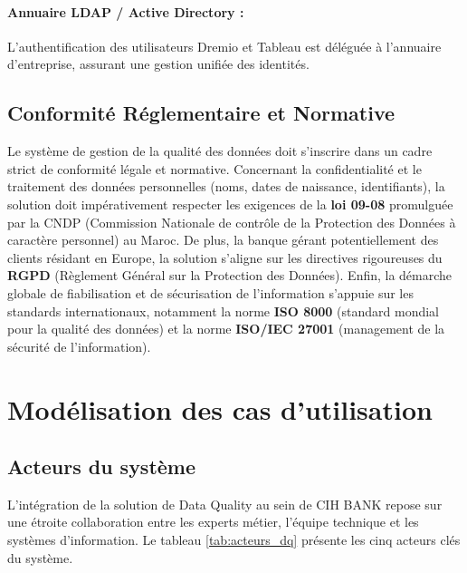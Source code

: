 \paragraph{Annuaire LDAP / Active Directory :} L'authentification des utilisateurs Dremio et Tableau est déléguée à l'annuaire d'entreprise, assurant une gestion unifiée des identités.

\subsection{Conformité Réglementaire et Normative}
Le système de gestion de la qualité des données doit s'inscrire dans un cadre strict de conformité légale et normative. Concernant la confidentialité et le traitement des données personnelles (noms, dates de naissance, identifiants), la solution doit impérativement respecter les exigences de la \textbf{loi 09-08} promulguée par la CNDP (Commission Nationale de contrôle de la Protection des Données à caractère personnel) au Maroc. De plus, la banque gérant potentiellement des clients résidant en Europe, la solution s'aligne sur les directives rigoureuses du \textbf{RGPD} (Règlement Général sur la Protection des Données). Enfin, la démarche globale de fiabilisation et de sécurisation de l'information s'appuie sur les standards internationaux, notamment la norme \textbf{ISO 8000} (standard mondial pour la qualité des données) et la norme \textbf{ISO/IEC 27001} (management de la sécurité de l'information).

\section{Modélisation des cas d'utilisation}

\subsection{Acteurs du système}
L'intégration de la solution de Data Quality au sein de CIH BANK repose sur une étroite collaboration entre les experts métier, l'équipe technique et les systèmes d'information. Le tableau \ref{tab:acteurs_dq} présente les cinq acteurs clés du système.

